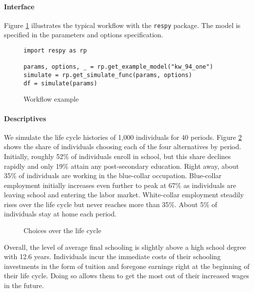 \paragraph{Interface} Figure \ref{Workflow example} illustrates the typical workflow with the \verb+respy+ package. The model is specified in the parameters and options specification.

\begin{figure}[ht!]\centering
\caption{Workflow example}\label{Workflow example}
\begin{lstlisting}
import respy as rp

params, options, _ = rp.get_example_model("kw_94_one")
simulate = rp.get_simulate_func(params, options)
df = simulate(params)

\end{lstlisting}
\end{figure}

\paragraph{Descriptives} We simulate the life cycle histories of 1,000 individuals for 40 periods. Figure \ref{Choices over the life cycle} shows the share of individuals choosing each of the four alternatives by period. Initially, roughly 52\% of individuals enroll in school, but this share declines rapidly and only 19\% attain any post-secondary education. Right away, about 35\% of individuals are working in the blue-collar occupation.  Blue-collar employment initially increases even further to peak at 67\% as individuals are leaving school and entering the labor market. White-collar employment steadily rises over the life cycle but never reaches more than 35\%. About 5\% of individuals stay at home each period.

\begin{figure}[ht!]\centering
\caption{Choices over the life cycle}\label{Choices over the life cycle}
\end{figure}\FloatBarrier

\noindent Overall, the level of average final schooling is slightly above a high school degree with 12.6 years. Individuals incur the immediate costs of their schooling investments in the form of tuition and foregone earnings right at the beginning of their life cycle. Doing so allows them to get the most out of their increased wages in the future.

